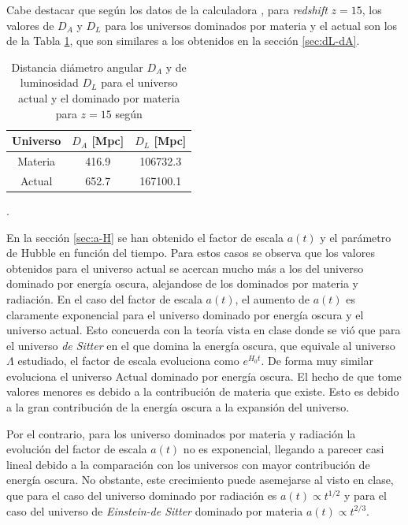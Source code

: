 \documentclass[twoside]{article}
\begin{document}
			Cabe destacar que según los datos de la calculadora \cite{CalculadorasI}, para \textit{redshift} $z=15$, los valores de $D_A$ y $D_L$ para los universos dominados por materia y el actual son los de la Tabla \ref{Tab:DA-DL}, que son similares a los obtenidos en la sección \ref{sec:dL-dA}.

				\begin{table}[H]
					\centering
					\begin{tabular}{ccc}
						\hline
						\centering
							Universo & $D_A$ [Mpc] & $D_L$ [Mpc] \\ \hline
							Materia & 416.9 & 106732.3 \\ 
							Actual & 652.7 & 167100.1 \\ \hline
					\end{tabular}
					\caption{\label{Tab:DA-DL}Distancia diámetro angular $D_A$ y de luminosidad $D_L$ para el universo actual y el dominado por materia para $z=15$ según \cite{CalculadorasI}}.
				\end{table}

			En la sección \ref{sec:a-H} se han obtenido el factor de escala $a(t)$ y el parámetro de Hubble en función del tiempo. Para estos casos se observa que los valores obtenidos para el universo actual se acercan mucho más a los del universo dominado por energía oscura, alejandose de los dominados por materia y radiación. En el caso del factor de escala $a(t)$, el aumento de $a(t)$ es claramente exponencial para el universo dominado por energía oscura y el universo actual. Esto concuerda con la teoría vista en clase donde se vió que para el universo \textit{de Sitter} en el que domina la energía oscura, que equivale al universo $\Lambda$ estudiado, el factor de escala evoluciona como $e^{H_0t}$. De forma muy similar evoluciona el universo Actual dominado por energía oscura. El hecho de que tome valores menores es debido a la contribución de materia que existe. Esto es debido a la gran contribución de la energía oscura a la expansión del universo.

			Por el contrario, para los universo dominados por materia y radiación la evolución del factor de escala $a(t)$ no es exponencial, llegando a parecer casi lineal debido a la comparación con los universos con mayor contribución de energía oscura. No obstante, este crecimiento puede asemejarse al visto en clase, que para el caso del universo dominado por radiación es $a(t) \propto t^{1/2}$ y para el caso del universo de \textit{Einstein-de Sitter} dominado por materia $a(t) \propto t^{2/3}$.
\end{document}
